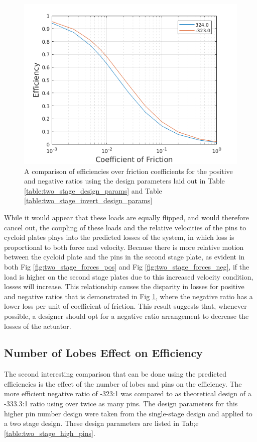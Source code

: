 \begin{figure}[h]
	\centering
	\includegraphics[width=0.75\linewidth]{fig/two_stage_pos_neg}
   \caption{A comparison of efficiencies over friction coefficients for the positive and negative ratios using the design parameters laid out in Table \ref{table:two_stage_design_params} and Table \ref{table:two_stage_invert_design_params}}
   \label{fig:two_stage_pos_neg}
\end{figure}

While it would appear that these loads are equally flipped, and would therefore cancel out, the coupling of these loads and the relative velocities of the pins to cycloid plates plays into the predicted losses of the system, in which loss is proportional to both force and velocity. Because there is more relative motion between the cycloid plate and the pins in the second stage plate, as evident in both Fig \ref{fig:two_stage_forces_pos} and Fig \ref{fig:two_stage_forces_neg}, if the load is higher on the second stage plates due to this increased velocity condition, losses will increase. This relationship causes the disparity in losses for positive and negative ratios that is demonstrated in Fig \ref{fig:two_stage_pos_neg}, where the negative ratio has a lower loss per  unit of coefficient of friction. This result suggests that, whenever possible, a designer should opt for a negative ratio arrangement to decrease the losses of the actuator. 



\subsection{Number of Lobes Effect on Efficiency}\label{ch:dual:discussion:num_lobes}

The second interesting comparison that can be done using the predicted efficiencies is the effect of the number of lobes and pins on the efficiency. The more efficient negative ratio of -323:1 was compared to as theoretical design of a -333.3:1 ratio using over twice as many pins. The design parameters for this higher pin number design were taken from the single-stage design and applied to a two stage design. These design parameters are listed in Tab;e \ref{table:two_stage_high_pins}. 

